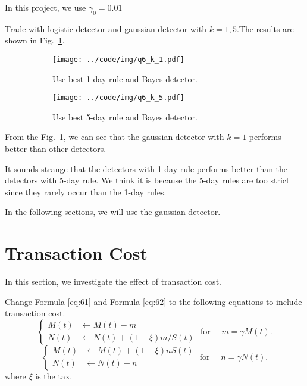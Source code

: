 \documentclass[runningheads]{llncs}
\begin{document}
In this project, we use $\gamma_0=0.01$

Trade with logistic detector and gaussian detector with $k=1,5$.The results are shown in Fig.~\ref{fig:q6}.

\begin{figure}[!htbp]
    \begin{subfigure}[t]{0.49\textwidth}
        \centering
        \texttt{[image: ../code/img/q6\_k\_1.pdf]}
        \caption{Use best 1-day rule and Bayes detector.}
    \end{subfigure}
    \begin{subfigure}[t]{0.49\textwidth}
        \centering
        \texttt{[image: ../code/img/q6\_k\_5.pdf]}
        \caption{Use best 5-day rule and Bayes detector.}
    \end{subfigure}
    \caption{}
    \label{fig:q6}
\end{figure}

From the Fig.~\ref{fig:q6}, we can see that the gaussian detector with $k=1$ performs better than other detectors.

It sounds strange that the detectors with 1-day rule performs better than the detectors with 5-day rule. 
We think it is because the 5-day rules are too strict since they rarely occur than the 1-day rules.

In the following sections, we will use the gaussian detector.

\section{Transaction Cost}\label{sec:7}

In this section, we investigate the effect of transaction cost.

Change Formula \ref{eq:61} and Formula \ref{eq:62} to the following equations to include transaction cost.
\begin{equation}
    \begin{cases}
        M(t) &\leftarrow M(t)-m \\
        N(t) &\leftarrow N(t)+(1-\xi)m / S(t)
    \end{cases}
    \text { for } \quad m=\gamma M(t).
\end{equation}
\begin{equation}
    \begin{cases}
        M(t) &\leftarrow M(t)+(1-\xi)n S(t) \\
        N(t) &\leftarrow N(t)-n
    \end{cases}
    \text { for } \quad n=\gamma N(t) . 
\end{equation}
where $\xi$ is the tax.
\end{document}
